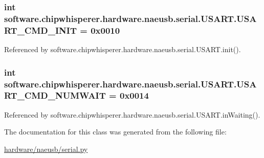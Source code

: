 \subsubsection[{U\+S\+A\+R\+T\+\_\+\+C\+M\+D\+\_\+\+I\+N\+I\+T}]{\setlength{\rightskip}{0pt plus 5cm}int software.\+chipwhisperer.\+hardware.\+naeusb.\+serial.\+U\+S\+A\+R\+T.\+U\+S\+A\+R\+T\+\_\+\+C\+M\+D\+\_\+\+I\+N\+I\+T = 0x0010\hspace{0.3cm}{\ttfamily [static]}}\label{classsoftware_1_1chipwhisperer_1_1hardware_1_1naeusb_1_1serial_1_1USART_a5ea2806550d1f6c14eaf1f7442ceeacc}


Referenced by software.\+chipwhisperer.\+hardware.\+naeusb.\+serial.\+U\+S\+A\+R\+T.\+init().

\hypertarget{classsoftware_1_1chipwhisperer_1_1hardware_1_1naeusb_1_1serial_1_1USART_a53da7293e0cbebad1283395b8cbb34bf}{}
\subsubsection[{U\+S\+A\+R\+T\+\_\+\+C\+M\+D\+\_\+\+N\+U\+M\+W\+A\+I\+T}]{\setlength{\rightskip}{0pt plus 5cm}int software.\+chipwhisperer.\+hardware.\+naeusb.\+serial.\+U\+S\+A\+R\+T.\+U\+S\+A\+R\+T\+\_\+\+C\+M\+D\+\_\+\+N\+U\+M\+W\+A\+I\+T = 0x0014\hspace{0.3cm}{\ttfamily [static]}}\label{classsoftware_1_1chipwhisperer_1_1hardware_1_1naeusb_1_1serial_1_1USART_a53da7293e0cbebad1283395b8cbb34bf}


Referenced by software.\+chipwhisperer.\+hardware.\+naeusb.\+serial.\+U\+S\+A\+R\+T.\+in\+Waiting().



The documentation for this class was generated from the following file\+:\begin{DoxyCompactItemize}
\item 
\hyperlink{hardware_2naeusb_2serial_8py}{hardware/naeusb/serial.\+py}\end{DoxyCompactItemize}
